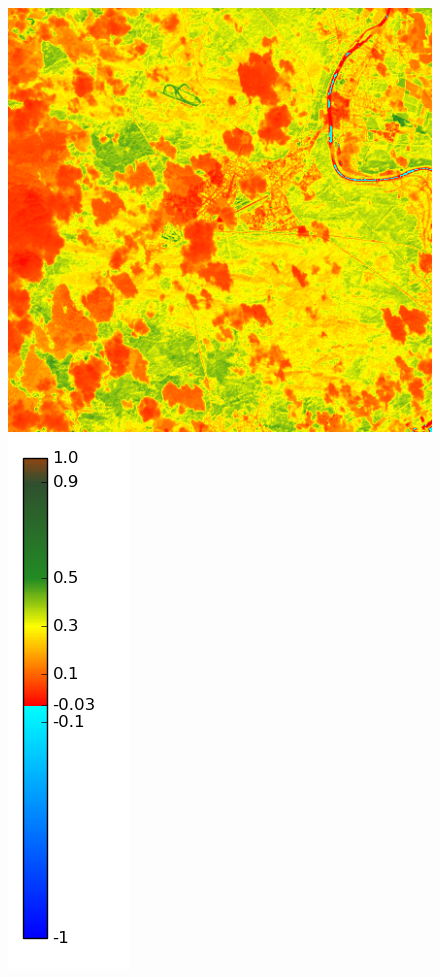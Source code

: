 \documentclass{book}
\begin{document}
\begin{figure}[H]
{\includegraphics[scale=0.2]{images/Fontainebleau/10_ndvi.png}
\includegraphics[scale=0.2]{images/colormap.png}
}
\end{figure}
\end{document}
